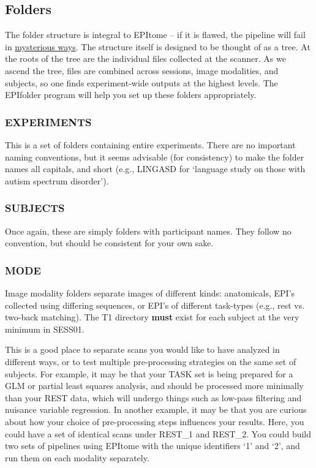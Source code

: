 \documentclass[final,titlepage,letterpaper,oneside,12pt]{article}
\renewcommand{\texttt}[2][BrickRed]{\textcolor{#1}{\ttfamily #2}}%
\begin{document}
\subsection{Folders}

The folder structure is integral to EPItome -- if it is flawed, the pipeline will fail in \href{https://www.youtube.com/watch?v=TxcDTUMLQJI}{mysterious ways}. The structure itself is designed to be thought of as a tree. At the roots of the tree are the individual files collected at the scanner. As we ascend the tree, files are combined across sessions, image modalities, and subjects, so one finds experiment-wide outputs at the highest levels. The \texttt{EPIfolder} program will help you set up these folders appropriately.

\subsubsection{EXPERIMENTS}

This is a set of folders containing entire experiments. There are no important naming conventions, but it seems advisable (for consistency) to make the folder names all capitals, and short (e.g., \texttt{LINGASD} for `language study on those with autism spectrum disorder').

\subsubsection{SUBJECTS}

Once again, these are simply folders with participant names. They follow no convention, but should be consistent for your own sake.

\subsubsection{MODE}

Image modality folders separate images of different kinds: anatomicals, EPI's collected using differing sequences, or EPI's of different task-types (e.g., rest vs. two-back matching). The T1 directory \textbf{must} exist for each subject at the very minimum in \texttt{SESS01}.

This is a good place to separate scans you would like to have analyzed in different ways, or to test multiple pre-processing strategies on the same set of subjects. For example, it may be that your \texttt{TASK} set is being prepared for a GLM or partial least squares analysis, and should be processed more minimally than your \texttt{REST} data, which will undergo things such as low-pass filtering and nuisance variable regression. In another example, it may be that you are curious about how your choice of pre-processing steps influences your results. Here, you could have a set of identical scans under \texttt{REST\_1} and \texttt{REST\_2}. You could build two sets of pipelines using EPItome with the unique identifiers `1' and `2', and run them on each modality separately.
\end{document}
